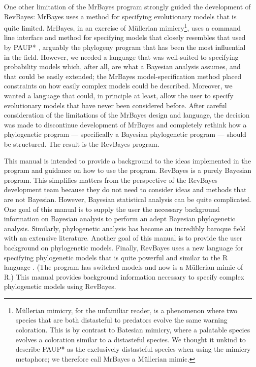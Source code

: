 \documentclass{article}
\begin{document}
One other limitation of the MrBayes program strongly guided the development of RevBayes: MrBayes uses a method for specifying
evolutionary models that is quite limited. MrBayes, in an exercise of M\"ullerian mimicry\footnote{M\"ullerian mimicry, for the 
unfamiliar reader, is a phenomenon where two species that are both distasteful to predators evolve the same warning coloration.
This is by contrast to Batesian mimicry, where a palatable species evolves a coloration similar to a distasteful species.
We thought it unkind to describe PAUP* as the exclusively distasteful species when using the mimicry metaphore; we therefore call
MrBayes a M\"ullerian mimic.}, 
uses a command line interface and
method for specifying models that closely resembles that used by PAUP* \citep{swofford98}, arguably the phylogeny program that has
been the most influential in the field.
However, we needed a language that was well-suited to specifying probability models which, after all, are what a Bayesian analysis assumes,
and that could be easily extended; the MrBayes model-specification method placed constraints on how easily complex models could be described.
Moreover, we wanted a language that could, in principle at least, allow the user to specify evolutionary
models that have never been considered before. 
After careful consideration of the limitations of the MrBayes design and language, 
the decision was made to discontinue development of MrBayes and completely rethink how a phylogenetic program --- specifically a
Bayesian phylogenetic program --- should be structured. The result is the RevBayes program.

This manual is intended to provide a background to the ideas implemented in the program and guidance on how to use the program.
RevBayes is a purely Bayesian program. This simplifies matters from the perspective of the RevBayes development team because
they do not need to consider ideas and methods that are not Bayesian. 
However, Bayesian statistical analysis can be quite complicated.
One goal of this manual is to supply the user the necessary background information on Bayesian analysis to perform an adept Bayesian
phylogenetic analysis.
Similarly, phylogenetic analysis has become an incredibly baroque field with an extensive literature. Another goal of
this manual is to provide the user background on phylogenetic models. Finally, RevBayes uses a new language for specifying 
phylogenetic models that is quite powerful and similar to the R language \citep{ihaka96}. 
(The program has switched models and now is a M\"ullerian mimic of R.)
This manual provides background information necessary to specify complex phylogenetic models using RevBayes.
\end{document}
